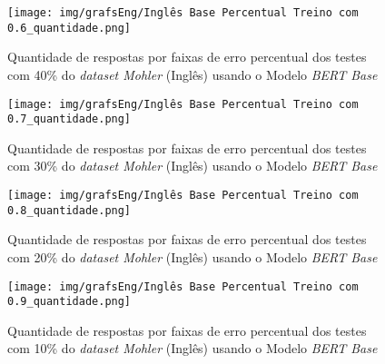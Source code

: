 \begin{figure}[h!]
\texttt{[image: img/grafsEng/Inglês Base Percentual Treino com 0.6\_quantidade.png]}
\caption{Quantidade de respostas por faixas de erro percentual dos testes com 40\% do \textit{dataset Mohler} (Inglês) usando o Modelo \textit{BERT Base}}\label{figure:16}
\end{figure}

\begin{figure}[h!]
\texttt{[image: img/grafsEng/Inglês Base Percentual Treino com 0.7\_quantidade.png]}
\caption{Quantidade de respostas por faixas de erro percentual dos testes com 30\% do \textit{dataset Mohler} (Inglês) usando o Modelo \textit{BERT Base}}\label{figure:17}
\end{figure}

\begin{figure}[h!]
\texttt{[image: img/grafsEng/Inglês Base Percentual Treino com 0.8\_quantidade.png]}
\caption{Quantidade de respostas por faixas de erro percentual dos testes com 20\% do \textit{dataset Mohler} (Inglês) usando o Modelo \textit{BERT Base}}\label{figure:18}
\end{figure}

\begin{figure}[h!]
\texttt{[image: img/grafsEng/Inglês Base Percentual Treino com 0.9\_quantidade.png]}
\caption{Quantidade de respostas por faixas de erro percentual dos testes com 10\% do \textit{dataset Mohler} (Inglês) usando o Modelo \textit{BERT Base}}\label{figure:19}
\end{figure}
